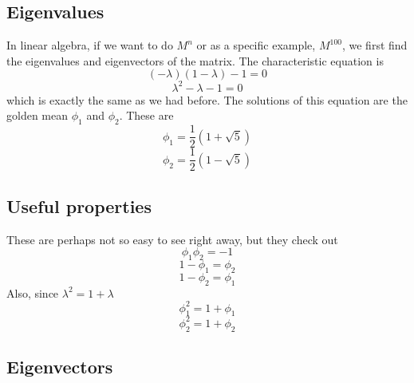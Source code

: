 \documentclass[11pt, oneside]{article}
\begin{document}
\subsection*{Eigenvalues}

In linear algebra, if we want to do $M^n$ or as a specific example, $M^{100}$, we first find the eigenvalues and eigenvectors of the matrix.  The characteristic equation is
\[ (-\lambda)(1 - \lambda) - 1 = 0 \]
\[ \lambda^2 - \lambda - 1 = 0 \]
which is exactly the same as we had before.
The solutions of this equation are the golden mean $\phi_1$ and $\phi_2$.  These are
\[ \phi_1 = \frac{1}{2} (1 + \sqrt{5})\]
\[ \phi_2 = \frac{1}{2} (1 - \sqrt{5}) \]

\subsection*{Useful properties}
These are perhaps not so easy to see right away, but they check out
\[ \phi_1 \phi_2 = - 1 \]
\[ 1- \phi_1 = \phi_2 \]
\[ 1 - \phi_2 = \phi_1 \]
Also, since $\lambda^2 = 1 +  \lambda$
\[ \phi_1^2 = 1 + \phi_1 \]
\[ \phi_2^2 = 1 + \phi_2 \]

\subsection*{Eigenvectors}
\end{document}
